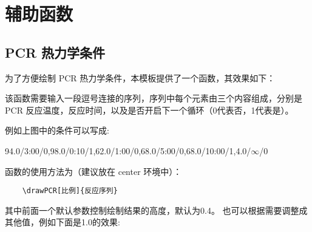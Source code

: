 \chapter{辅助函数}
\label{cha:function}
\section{PCR 热力学条件}
\label{sec:PCR}

为了方便绘制 PCR 热力学条件，本模板提供了一个函数，其效果如下：

\begin{center}
\end{center}

该函数需要输入一段逗号连接的序列，序列中每个元素由三个内容组成，分别是 PCR 反应温度，反应时间，以及是否开启下一个循环（0代表否，1代表是）。

例如上图中的条件可以写成:

94.0/3:00/0,98.0/0:10/1,62.0/1:00/0,68.0/5:00/0,68.0/10:00/1,4.0/$\infty$/0

函数的使用方法为（建议放在 center 环境中）：
\begin{verbatim}
    \drawPCR[比例]{反应序列}
\end{verbatim}

其中前面一个默认参数控制绘制结果的高度，默认为0.4。
也可以根据需要调整成其他值，例如下面是1.0的效果:
\begin{center}
\end{center}